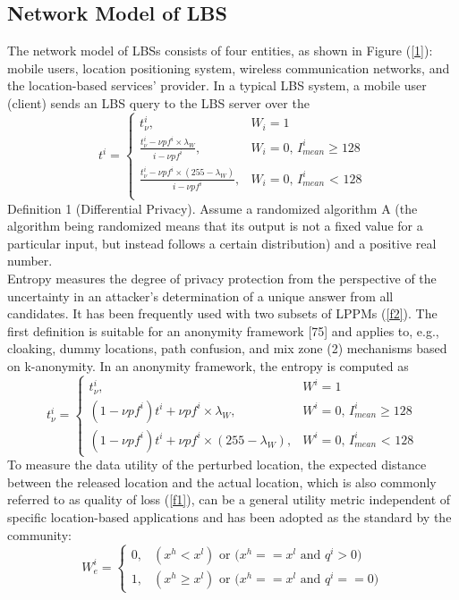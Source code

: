 \documentclass{opticajnl}
\begin{document}
\subsection{Network Model of LBS}
The network model of LBSs consists of four entities, as shown in Figure (\ref{1}): mobile users, location positioning system, wireless communication networks, and the location-based services’ provider. In a typical LBS system, a mobile user (client) sends an LBS query to the LBS server over the
\begin{equation}
\label{f1}
    t^i = 
    \begin{cases}
    t^i_{\nu}, &\text{$W_i=1$}\\ 
    \frac{t^i_\nu-\nu p f^i \times \lambda_W}{i - \nu p f^i}, &\text{$W_i=0$, $I^i_{mean} \ge 128$}\\
    \frac{t^i_\nu-\nu p f^i \times (255-\lambda_W)}{i - \nu p f^i}, &\text{$W_i=0$, $I^i_{mean}$ < 128}\\
    \end{cases}
\end{equation}
Definition 1 (Differential Privacy). Assume a randomized algorithm A (the algorithm being randomized means that its output is not a fixed value for a particular input, but instead follows a certain distribution) and a positive real number.
\\
Entropy measures the degree of privacy protection from the perspective of the uncertainty in an attacker’s determination of a unique answer from all candidates. It has been frequently used with two subsets of LPPMs (\ref{f2}). The first definition is suitable for an anonymity framework [75] and applies to, e.g., cloaking, dummy locations, path confusion, and mix zone (2) mechanisms based on k-anonymity. In an anonymity framework, the entropy is computed as
\begin{equation}
\label{f2}
    t^i_\nu = 
    \begin{cases}
    t^i_\nu, &\text{$W^i=1$}\\
    {(1-\nu p f^i)t^i+\nu p f^i\times \lambda_W}, &\text{$W^i=0$, $I^i_{mean} \ge 128$}\\
    {(1-\nu p f^i)t^i+\nu p f^i\times(255 -\lambda_W)}, &\text{$W^i=0$, $I^i_{mean}$ < 128}
    \end{cases}
\end{equation}
To measure the data utility of the perturbed location, the expected distance between the released location and the actual location, which is also commonly referred to as quality of loss (\ref{f1}), can be a general utility metric independent of specific location-based applications and has been adopted as the standard by the community:
\begin{equation}
\label{f3}
    W^i_e = 
    \begin{cases}
    0, &\text{$(x^h<x^l)$ or $(x^h == x^l$ and $q^i > 0)$}\\
    1, &\text{$(x^h \ge x^l)$ or $(x^h==x^l$ and $q^i == 0)$}
    \end{cases}
\end{equation}
\end{document}
